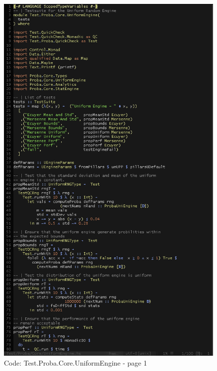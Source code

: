 \documentclass[12pt,a4paper,titlepage]{article}
\begin{document}
\begin{figure}[h!]
\centering
\includegraphics[width=1\textwidth]{img/code-test-uni-1.png}
\caption{Code: Test.Proba.Core.UniformEngine - page 1}
\label{fig:test.u1}
\end{figure}
\end{document}

